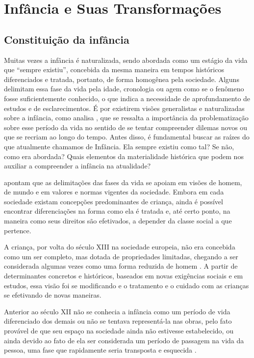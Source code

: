 
\chapter{Infância e Suas Transformações}

\section{Constituição da infância}

Muitas vezes a infância é naturalizada, sendo abordada como um estágio da vida que ``sempre existiu'', concebida da mesma maneira em tempos históricos diferenciados e tratada, portanto, de forma homogênea pela sociedade. Alguns delimitam essa fase da vida pela idade, cronologia ou agem como se o fenômeno fosse suficientemente conhecido, o que indica a necessidade de aprofundamento de estudos e de esclarecimentos. É por existirem visões generalistas e naturalizadas sobre a infância, como analisa , que se ressalta a importância da problematização sobre esse período da vida no sentido de se tentar compreender dilemas novos ou que se recriam ao longo do tempo. Antes disso, é fundamental buscar as raízes do que atualmente chamamos de Infância. Ela sempre existiu como tal? Se não, como era abordada? Quais elementos da materialidade histórica que podem nos auxiliar a compreender a infância na atualidade?

 apontam que as delimitações das fases da vida se apoiam em visões de homem, de mundo e em valores e normas vigentes da sociedade. Embora em cada sociedade existam concepções predominantes de criança, ainda é possível encontrar diferenciações na forma como ela é tratada e, até certo ponto, na maneira como seus direitos são efetivados, a depender da classe social a que pertence.

A criança, por volta do século XIII na sociedade europeia, não era concebida como um ser completo, mas dotada de propriedades limitadas, chegando a ser considerada algumas vezes como uma forma reduzida de homem \cite{ARIES2011}. A partir de determinantes concretos e históricos, baseados em novas exigências sociais e em estudos, essa visão foi se modificando e o tratamento e o cuidado com as crianças se efetivando de novas maneiras. 

Anterior ao século XII não se conhecia a infância como um período de vida diferenciado dos demais ou não se tentava representá-la nas obras, pelo fato provável de que seu espaço na sociedade ainda não estivesse estabelecido\footnotemark, ou ainda devido ao fato de ela ser considerada um período de passagem na vida da pessoa, uma fase que rapidamente seria transposta e esquecida \cite{ARIES2011}.

